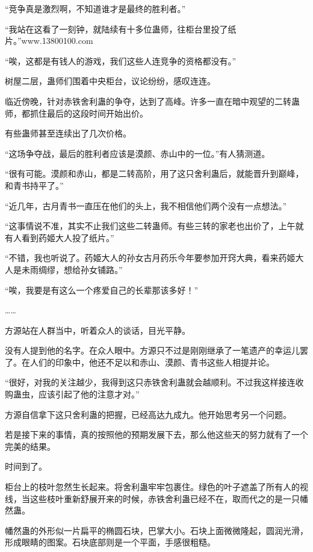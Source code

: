 
\begin{this_body}

“竞争真是激烈啊，不知道谁才是最终的胜利者。”

“我站在这看了一刻钟，就陆续有十多位蛊师，往柜台里投了纸片。”www.13800100.com

“唉，这都是有钱人的游戏，我们这些人连竞争的资格都没有。”

树屋二层，蛊师们围着中央柜台，议论纷纷，感叹连连。

临近傍晚，针对赤铁舍利蛊的争夺，达到了高峰。许多一直在暗中观望的二转蛊师，都抓住最后的这段时间开始出价。

有些蛊师甚至连续出了几次价格。

“这场争夺战，最后的胜利者应该是漠颜、赤山中的一位。”有人猜测道。

“很有可能。漠颜和赤山，都是二转高阶，用了这只舍利蛊后，就能晋升到巅峰，和青书持平了。”

“近几年，古月青书一直压在他们的头上，我不相信他们两个没有一点想法。”

“这事情说不准，其实不止我们这些二转蛊师。有些三转的家老也出价了，上午就有人看到药姬大人投了纸片。”

“不错，我也听说了。药姬大人的孙女古月药乐今年要参加开窍大典，看来药姬大人是未雨绸缪，想给孙女铺路。”

“唉，我要是有这么一个疼爱自己的长辈那该多好！”

……

方源站在人群当中，听着众人的谈话，目光平静。

没有人提到他的名字。在众人眼中。方源只不过是刚刚继承了一笔遗产的幸运儿罢了。在人们的印象中，他还不足以和赤山、漠颜、青书这些人相提并论。

“很好，对我的关注越少，我得到这只赤铁舍利蛊就会越顺利。不过我这样接连收购蛊虫，应该引起了他的注意才对。”

方源自信拿下这只舍利蛊的把握，已经高达九成九。他开始思考另一个问题。

若是接下来的事情，真的按照他的预期发展下去，那么他这些天的努力就有了一个完美的结果。

时间到了。

柜台上的枝叶忽然生长起来。将舍利蛊牢牢包裹住。绿色的叶子遮盖了所有人的视线，当这些枝叶重新舒展开来的时候，赤铁舍利蛊已经不在，取而代之的是一只幡然蛊。

幡然蛊的外形似一片扁平的椭圆石块，巴掌大小。石块上面微微隆起，圆润光滑，形成眼睛的图案。石块底部则是一个平面，手感很粗糙。


\end{this_body}
